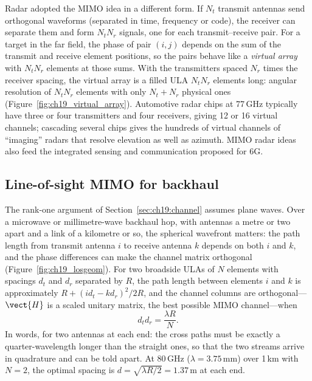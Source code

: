 Radar adopted the MIMO idea in a different form. If $N_t$ transmit antennas send orthogonal waveforms
(separated in time, frequency or code), the receiver can separate them and form $N_tN_r$ signals, one
for each transmit--receive pair. For a target in the far field, the phase of pair $(i,j)$ depends on
the sum of the transmit and receive element positions, so the pairs behave like a \emph{virtual
array} with $N_tN_r$ elements at those sums. With the transmitters spaced $N_r$ times the receiver
spacing, the virtual array is a filled ULA $N_tN_r$ elements long: angular resolution of $N_tN_r$
elements with only $N_t+N_r$ physical ones (Figure~\ref{fig:ch19_virtual_array}). Automotive radar
chips at 77\,GHz typically have three or four transmitters and four receivers, giving 12 or 16
virtual channels; cascading several chips gives the hundreds of virtual channels of ``imaging''
radars that resolve elevation as well as azimuth. MIMO radar ideas also feed the integrated sensing
and communication proposed for 6G.


\subsection{Line-of-sight MIMO for backhaul}

The rank-one argument of Section~\ref{sec:ch19:channel} assumes plane waves. Over a microwave or
millimetre-wave backhaul hop, with antennas a metre or two apart and a link of a kilometre or so, the
spherical wavefront matters: the path length from transmit antenna $i$ to receive antenna $k$
depends on both $i$ and $k$, and the phase differences can make the channel matrix orthogonal
(Figure~\ref{fig:ch19_losgeom}). For two broadside ULAs of $N$ elements with spacings $d_t$ and
$d_r$ separated by $R$, the path length between elements $i$ and $k$ is approximately
$R+(id_t-kd_r)^2/2R$, and the channel columns are orthogonal---$\vect{H}$ is a scaled unitary
matrix, the best possible MIMO channel---when
\begin{equation}
d_td_r=\frac{\lambda R}{N}.
\label{eq:ch19:losmimo}
\end{equation}
In words, for two antennas at each end: the cross paths must be exactly a quarter-wavelength longer
than the straight ones, so that the two streams arrive in quadrature and can be told apart. At 80\,GHz ($\lambda=3.75$\,mm) over 1\,km with
$N=2$, the optimal spacing is $d=\sqrt{\lambda R/2}=1.37$\,m at each end.

